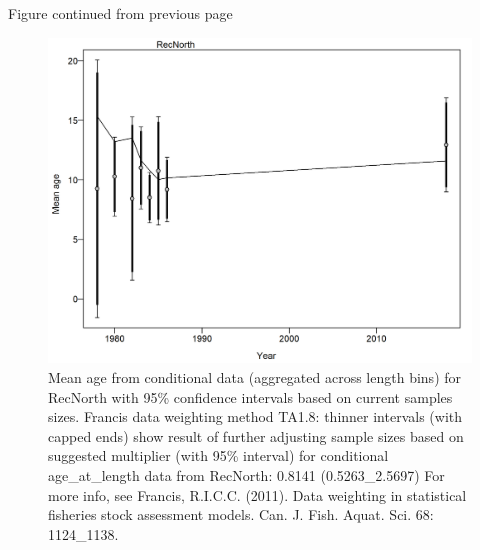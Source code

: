 \documentclass[12pt,]{article}
\begin{document}
\begin{center} 

              Figure continued from previous page 

             \end{center}

\begin{figure}
\centering
\includegraphics{./r4ss/plots_mod1/comp_condAALfit_data_weighting_TA1.8_condAgeRecNorth.png}
\caption{Mean age from conditional data (aggregated across length bins)
for RecNorth with 95\% confidence intervals based on current samples
sizes. Francis data weighting method TA1.8: thinner intervals (with
capped ends) show result of further adjusting sample sizes based on
suggested multiplier (with 95\% interval) for conditional
age\_at\_length data from RecNorth: 0.8141 (0.5263\_2.5697) For more
info, see Francis, R.I.C.C. (2011). Data weighting in statistical
fisheries stock assessment models. Can. J. Fish. Aquat. Sci. 68:
1124\_1138.
\label{fig:mod1_8_comp_condAALfit_data_weighting_TA1.8_condAgeRecNorth}}
\end{figure}
\end{document}
